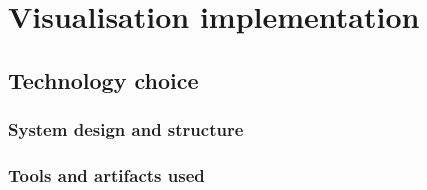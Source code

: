 \chapter{Visualisation implementation}\label{C:sd}

\section{Technology choice}
\subsection{System design and structure}
\subsection{Tools and artifacts used}


